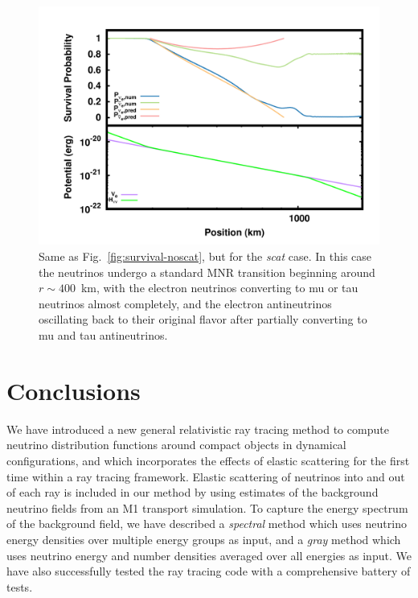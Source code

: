 \documentclass[aps,floatfix,prd,superscriptaddress,twocolumn]{revtex4-1}
\begin{document}
\begin{figure}
  \includegraphics[width=\columnwidth]{fig-survival_prob-scat_ih}
  \caption{Same as Fig.~\ref{fig:survival-noscat},
    but for the \emph{scat} case.
    In this case the neutrinos undergo a standard MNR transition
    beginning around $r\sim400$~km,
    with the electron neutrinos converting to mu or tau neutrinos almost
    completely,
    and the electron antineutrinos oscillating back to their original flavor
    after partially converting to mu and tau antineutrinos.
  }
  \label{fig:survival-scat}
\end{figure}

\section{Conclusions}
\label{sec:conclusions}
We have introduced a new general relativistic ray tracing method to compute
neutrino distribution functions around compact objects in dynamical configurations,
and which incorporates the effects of elastic scattering for the first time
within a ray tracing framework.
Elastic scattering of neutrinos into and out of each ray is included in our
method by using estimates of the background neutrino fields from an
M1 transport simulation.
To capture the energy spectrum of the background field, we have described a
\emph{spectral} method which uses neutrino energy densities over multiple
energy groups as input, and a
\emph{gray} method which uses neutrino energy and number densities averaged
over all energies as input.
We have also successfully tested the ray tracing code with a comprehensive
battery of tests.
\end{document}
